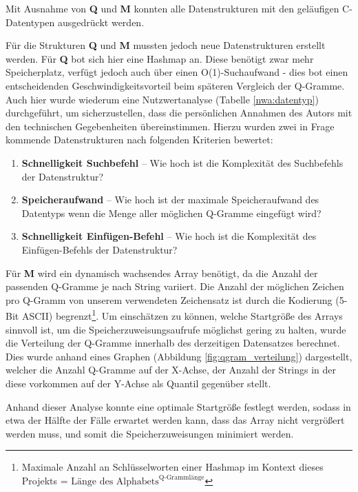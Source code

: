 Mit Ausnahme von \textbf{Q} und \textbf{M} konnten  alle Datenstrukturen mit den geläufigen C-Datentypen ausgedrückt werden.

Für die Strukturen \textbf{Q} und \textbf{M} mussten jedoch neue Datenstrukturen
erstellt werden. Für \textbf{Q} bot sich hier eine Hashmap an. Diese benötigt zwar
mehr Speicherplatz, verfügt jedoch auch über einen O(1)-Suchaufwand - dies bot einen entscheidenden Geschwindigkeitsvorteil beim späteren Vergleich der Q-Gramme.
Auch hier wurde wiederum eine Nutzwertanalyse (Tabelle \ref{nwa:datentyp}) durchgeführt,
um sicherzustellen, dass die persönlichen Annahmen des Autors mit den technischen
Gegebenheiten übereinstimmen.
Hierzu wurden zwei in Frage kommende Datenstrukturen nach folgenden Kriterien bewertet:

\begin{enumerate}
	\item \textbf{Schnelligkeit Suchbefehl} -- Wie hoch ist die Komplexität des Suchbefehls der Datenstruktur?
    \item \textbf{Speicheraufwand} -- Wie hoch ist der maximale Speicheraufwand des Datentyps wenn die Menge aller möglichen Q-Gramme eingefügt wird?
    \item \textbf{Schnelligkeit Einfügen-Befehl} -- Wie hoch ist die Komplexität des Einfügen-Befehls der Datenstruktur?\\

\end{enumerate}

Für \textbf{M} wird ein dynamisch wachsendes Array benötigt, da die Anzahl der passenden
Q-Gramme je nach String variiert. Die Anzahl der möglichen Zeichen pro Q-Gramm
von unserem verwendeten Zeichensatz ist durch die Kodierung (5-Bit ASCII)
begrenzt\footnote{Maximale Anzahl an Schlüsselworten einer Hashmap im Kontext dieses Projekts = $\text{Länge des Alphabets}^\text{Q-Grammlänge}$ }.
Um einschätzen zu können, welche Startgröße des Arrays sinnvoll ist, um die
Speicherzuweisungsaufrufe möglichst gering zu halten, wurde die Verteilung der
Q-Gramme innerhalb des derzeitigen Datensatzes berechnet. Dies wurde anhand eines
Graphen (Abbildung \ref{fig:qgram_verteilung}) dargestellt, welcher die Anzahl
Q-Gramme auf der X-Achse, der Anzahl der Strings in der diese vorkommen auf der Y-Achse als Quantil gegenüber stellt.

Anhand dieser Analyse konnte eine optimale Startgröße festlegt werden, sodass in etwa der Hälfte der Fälle
erwartet werden kann, dass das Array nicht vergrößert werden muss, und somit die
Speicherzuweisungen minimiert werden.


